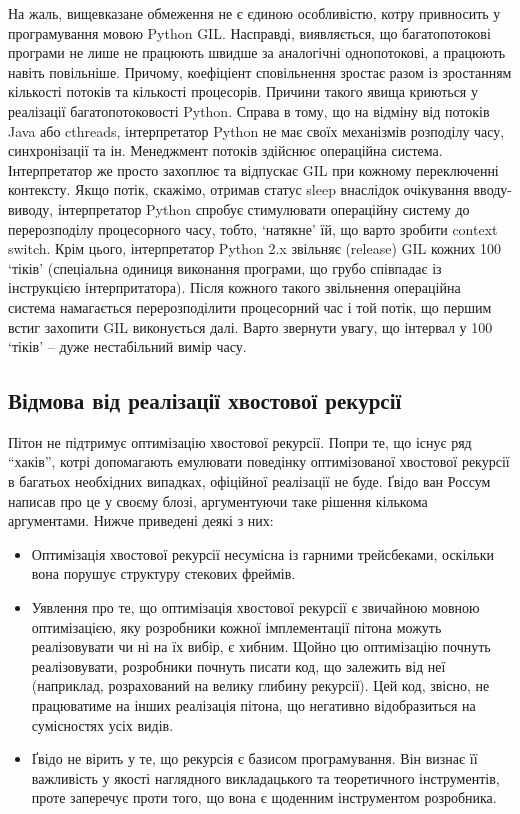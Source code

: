 \documentclass[a4paper, 12pt, onsedie]{article}
\begin{document}
    На жаль, вищевказане обмеження не є єдиною особливістю, котру привносить у програмування
    мовою Python GIL. Насправді, виявляється, що багатопотокові програми не лише не працюють
    швидше за аналогічні однопотокові, а працюють навіть повільніше. Причому, коефіціент
    сповільнення зростає разом із зростанням кількості потоків та кількості процесорів.
    Причини такого явища криються у реалізації багатопотоковості Python. Справа в тому, що
    на відміну від потоків Java або cthreads, інтерпретатор Python не має своїх механізмів
    розподілу часу, синхронізації та ін. Менеджмент потоків здійснює операційна система.
    Інтерпретатор же просто захоплює та відпускає GIL при кожному переключенні контексту.
    Якщо потік, скажімо, отримав статус sleep внаслідок очікування вводу-виводу, 
    інтерпретатор Python спробує стимулювати операційну систему до перерозподілу процесорного
    часу, тобто, `натякне' їй, що варто зробити context switch. Крім цього, інтерпретатор
    Python 2.x звільняє (release) GIL кожних 100 `тіків' 
    (спеціальна одиниця виконання програми, що грубо співпадає із інструкцією інтерпритатора).
    Після кожного такого звільнення операційна система намагається перерозподілити процесорний
    час і той потік, що першим встиг захопити GIL виконується далі. Варто звернути увагу, що
    інтервал у 100 `тіків' -- дуже нестабільний вимір часу.


\subsection{Відмова від реалізації хвостової рекурсії}
    Пітон не підтримує оптимізацію хвостової рекурсії. Попри те, що існує ряд ``хаків'', котрі
    допомагають емулювати поведінку оптимізованої хвостової рекурсії в багатьох необхідних
    випадках, офіційної реалізації не буде. Ґвідо ван Россум написав про це у своєму блозі,
    аргументуючи таке рішення кількома аргументами. Нижче приведені деякі з них:
     \begin{itemize}
        \item Оптимізація хвостової рекурсії несумісна із гарними трейсбеками, оскільки вона
        порушує структуру стекових фреймів.
        \item Уявлення про те, що оптимізація хвостової рекурсії є звичайною мовною 
        оптимізацією, яку розробники кожної імплементації пітона можуть реалізовувати чи ні на 
        їх вибір, є хибним. Щойно цю оптимізацію почнуть реалізовувати, розробники почнуть 
        писати код, що залежить від неї (наприклад, розрахований на велику глибину рекурсії). 
        Цей код, звісно, не працюватиме на інших реалізація пітона, що негативно відобразиться 
        на сумісностях усіх видів.
        \item Ґвідо не вірить у те, що рекурсія є базисом програмування. Він визнає її 
        важливість у якості наглядного викладацького та теоретичного інструментів, проте 
        заперечує проти того, що вона є щоденним інструментом розробника.
     \end{itemize}
\end{document}
